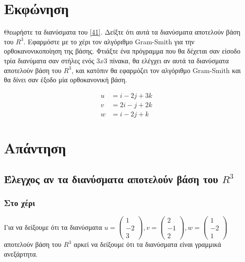 \documentclass[12pt, fleqn, leqno]{extreport}
\begin{document}
\section{Εκφώνηση}

Θεωρήστε τα διανύσματα του \eqref{41}. Δείξτε ότι αυτά τα διανύσματα αποτελούν βάση του $R^{3}$. Εφαρμόστε με το χέρι τον αλγόριθμο Gram-Smith για την ορθοκανονικοποίηση της βάσης. Φτιάξτε ένα πρόγραμμα που θα δέχεται σαν είσοδο τρία διανύματα σαν στήλες ενός $3x3$ πίνακα, θα ελέγχει αν αυτά τα διανύσματα αποτελούν βάση του $R^{3}$, και κατόπιν θα εφαρμόζει τον αλγόριθμο Gram-Smith και θα δίνει σαν έξοδο μία ορθοκανονική βάση.

\begin{equation}
    \begin{aligned}
        u & = i - 2j + 3k \\
        v & = 2i - j + 2k \\
        w & = i - 2j + k
    \end{aligned}\label{41}
\end{equation}

\newpage
\section{Απάντηση}

\subsection{Έλεγχος αν τα διανύσματα αποτελούν βάση του $R^{3}$}

\subsubsection{Στο χέρι}

Για να δείξουμε ότι τα διανύσματα 
$
    u = \begin{pmatrix}
        1 \\ -2 \\ 3
    \end{pmatrix},
    v = \begin{pmatrix}
        2 \\ -1 \\ 2
    \end{pmatrix},
    w = \begin{pmatrix}
        1 \\ -2 \\ 1
    \end{pmatrix}
$
αποτελούν βάση του $R^{3}$ αρκεί να δείξουμε ότι τα διανύσματα είναι γραμμικά ανεξάρτητα.
\end{document}
